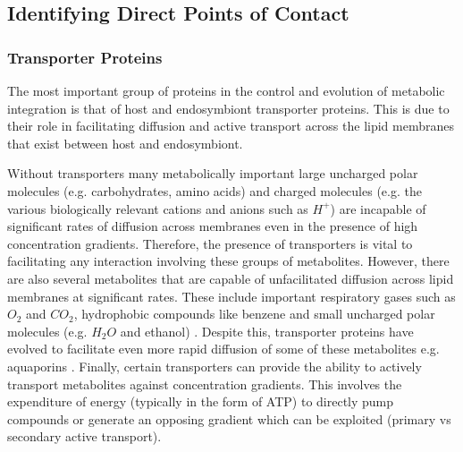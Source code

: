 %


\subsection{Identifying Direct Points of Contact}
\subsubsection{Transporter Proteins}

The most important group of proteins in the control and evolution
of metabolic integration is that of host and endosymbiont transporter proteins.
This is due to their role in facilitating diffusion and active transport
across the lipid membranes that exist between host and endosymbiont.

Without transporters many metabolically important 
large uncharged polar molecules (e.g. carbohydrates, amino acids)
and charged molecules (e.g. the various biologically relevant cations and anions such
as \(H^{+}\)) are incapable of significant rates of diffusion 
across membranes even in the presence of high concentration gradients. 
Therefore, the presence of transporters is vital to facilitating
any interaction involving these groups of metabolites. 
However, there are also several metabolites that are capable 
of unfacilitated diffusion across lipid membranes at significant rates.
These include important respiratory gases such as \(O_{2}\) and \(CO_2\),
hydrophobic compounds like benzene and small uncharged polar molecules
(e.g. \(H_2O\) and ethanol) \citep{cooper2013the,alberts2015molecular}.  
Despite this, transporter proteins have evolved to facilitate
even more rapid diffusion of some of these metabolites e.g. aquaporins
\citep{Agre1993}.  
Finally, certain transporters can provide the ability
to actively transport metabolites against concentration gradients. 
This involves the expenditure of energy (typically in the form of ATP)
to directly pump compounds or generate an opposing gradient which can be
exploited (primary vs secondary active transport). 

